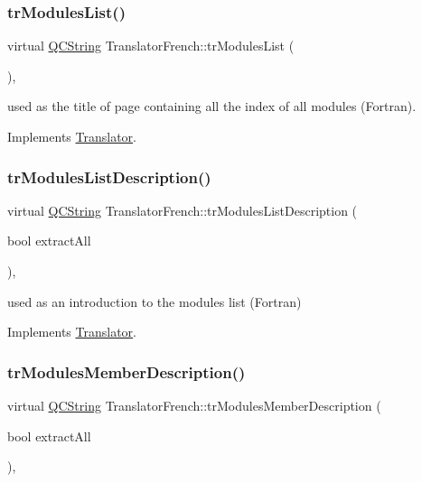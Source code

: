 \subsubsection{\texorpdfstring{trModulesList()}{trModulesList()}}
{\footnotesize\ttfamily virtual \mbox{\hyperlink{class_q_c_string}{Q\+C\+String}} Translator\+French\+::tr\+Modules\+List (\begin{DoxyParamCaption}{ }\end{DoxyParamCaption})\hspace{0.3cm}{\ttfamily [inline]}, {\ttfamily [virtual]}}

used as the title of page containing all the index of all modules (Fortran). 

Implements \mbox{\hyperlink{class_translator}{Translator}}.

\mbox{\label{class_translator_french_a951bbdfd561c4969fb6e7ff50a66b5c7}} 
\subsubsection{\texorpdfstring{trModulesListDescription()}{trModulesListDescription()}}
{\footnotesize\ttfamily virtual \mbox{\hyperlink{class_q_c_string}{Q\+C\+String}} Translator\+French\+::tr\+Modules\+List\+Description (\begin{DoxyParamCaption}\item[{bool}]{extract\+All }\end{DoxyParamCaption})\hspace{0.3cm}{\ttfamily [inline]}, {\ttfamily [virtual]}}

used as an introduction to the modules list (Fortran) 

Implements \mbox{\hyperlink{class_translator}{Translator}}.

\mbox{\label{class_translator_french_ade795251e42c5094c20880e1f2766b1f}} 
\subsubsection{\texorpdfstring{trModulesMemberDescription()}{trModulesMemberDescription()}}
{\footnotesize\ttfamily virtual \mbox{\hyperlink{class_q_c_string}{Q\+C\+String}} Translator\+French\+::tr\+Modules\+Member\+Description (\begin{DoxyParamCaption}\item[{bool}]{extract\+All }\end{DoxyParamCaption})\hspace{0.3cm}{\ttfamily [inline]}, {\ttfamily [virtual]}}

